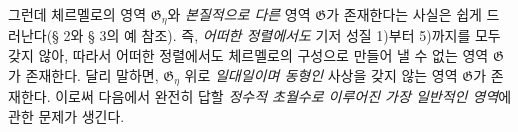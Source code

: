 
그런데 체르멜로의 영역 $\mathfrak G_\eta$와 \emph{본질적으로 다른} 영역 $\mathfrak G$가 존재한다는 사실은 쉽게 드러난다(§ 2와 § 3의 예 참조). 즉, \emph{어떠한 정렬에서도} 기저 성질 1)부터 5)까지를 모두 갖지 않아, 따라서 어떠한 정렬에서도 체르멜로의 구성으로 만들어 낼 수 없는 영역 $\mathfrak G$가 존재한다. 달리 말하면, $\mathfrak G_\eta$ 위로 \emph{일대일이며 동형인} 사상을 갖지 않는 영역 $\mathfrak G$가 존재한다. 이로써 다음에서 완전히 답할 \emph{정수적 초월수로 이루어진 가장 일반적인 영역}에 관한 문제가 생긴다.
